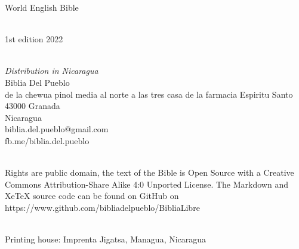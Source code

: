 World English Bible\\
\strut \\
1st edition 2022\\
\strut \\
\emph{Distribution in Nicaragua}\\
Biblia Del Pueblo\\
de la chewua pinol media al norte a las tres casa de la farmacia
Espiritu Santo\\
43000 Granada\\
Nicaragua\\
biblia.del.pueblo@gmail.com\\
fb.me/biblia.del.pueblo\\
\strut \\
Rights are public domain, the text of the Bible is Open Source with a
Creative Commons Attribution-Share Alike 4:0 Unported License. The
Markdown and XeTeX source code can be found on GitHub on\\
https://www.github.com/bibliadelpueblo/BibliaLibre\\
\strut \\
Printing house: Imprenta Jigatsa, Managua, Nicaragua\\
